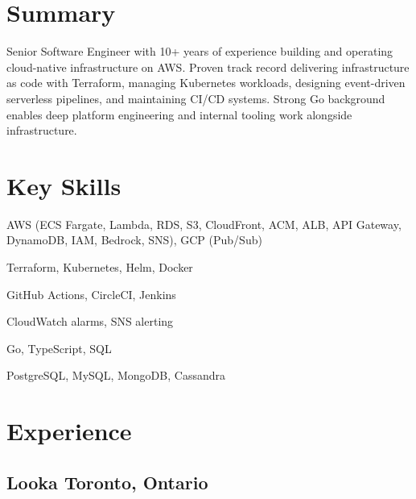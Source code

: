 \documentclass[10pt]{article}
\begin{document}


\section{Summary}
Senior Software Engineer with 10+ years of experience building and operating cloud-native infrastructure on AWS. Proven track record delivering infrastructure as code with Terraform, managing Kubernetes workloads, designing event-driven serverless pipelines, and maintaining CI/CD systems. Strong Go background enables deep platform engineering and internal tooling work alongside infrastructure.

\section{Key Skills}
\begin{description}[itemsep=0pt]
  \item[Cloud] AWS (ECS Fargate, Lambda, RDS, S3, CloudFront, ACM, ALB, API Gateway, DynamoDB, IAM, Bedrock, SNS), GCP (Pub/Sub)
  \item[IaC \& Containers] Terraform, Kubernetes, Helm, Docker
  \item[CI/CD] GitHub Actions, CircleCI, Jenkins
  \item[Observability] CloudWatch alarms, SNS alerting
  \item[Languages] Go, TypeScript, SQL
  \item[Databases] PostgreSQL, MySQL, MongoDB, Cassandra
\end{description}

\section{Experience}

\subsection{Looka \hfill Toronto, Ontario}
\end{document}
